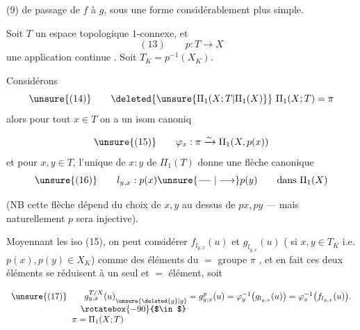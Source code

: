 (9) de passage de $f$ à $g$, sous une forme considérablement plus simple.

Soit $T$ un espace topologique  $1$-connexe, et
\[
(13)\qquad p:T\longrightarrow X
\]
une application continue . Soit $T_K=p^{-1}(X_K)$.

Considérons 
\[
\unsure{(14)}\qquad \deleted{\unsure{\Pi_1(X;T|\Pi_1(X)}}\ \Pi_1(X;T)=\pi
\]
alors pour tout $x\in T$ on a un isom canoniq

\[
\unsure{(15)}\qquad\varphi_x:\pi\xrightarrow{\sim}\Pi_1(X,p(x))
\]
et pour $x,y\in T$, l'unique   de  $x:y$ de $\Pi_1(T)$ donne  une flèche canonique
\[
\unsure{(16)}\qquad l_{y,x}:p(x)\unsure{\relbar\joinrel\relbar|\longrightarrow}p(y)\qquad\text{dans }\Pi_1(X)
\]

(NB cette flèche dépend du choix de $x,y$ au dessus de $px,py$ --- mais naturellement $p$ sera injective).

Moyennant les iso (15), on peut considérer $f_{l_{y,x}}(u)$ et $g_{l_{y,x}}(u)$ ( si $x,y\in T_K$ i.e. $p(x),p(y)\in X_K$) comme des éléments du $=$ groupe $\pi$ ,  et en fait ces deux éléments se réduisent à un seul et $=$ élément, soit

\[
\begin{array}{l}
\unsure{(17)}\qquad g_{y,x}^{T/X}(u)\raisebox{-1ex}{$\scriptstyle\unsure{\deleted{g}|g}$}=g_{y,x}^{p}(u)=\varphi_y^{-1}\bigl(g_{l_{y,x}}(u)\bigr)=\varphi_x^{-1}\bigl(f_{l_{y,x}}(u)\bigr).\\
\hspace{8em}\rotatebox{-90}{$\in$}\\
\hspace{7em}\pi=\Pi_1(X;T)
\end{array}
\]

